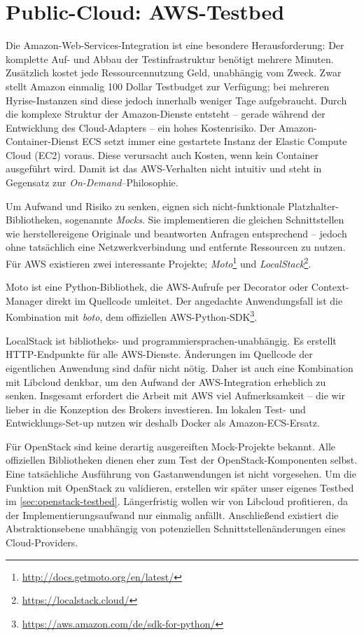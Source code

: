 \section{Public-Cloud: AWS-Testbed}
\label{sec:aws-testbed}

 Die Amazon-Web-Services-Integration ist eine besondere Herausforderung: Der komplette Auf- und Abbau der Testinfrastruktur benötigt mehrere Minuten. Zusätzlich kostet jede Ressourcennutzung Geld, unabhängig vom Zweck. Zwar stellt Amazon einmalig 100 Dollar Testbudget zur Verfügung; bei mehreren Hyrise-Instanzen sind diese jedoch innerhalb weniger Tage aufgebraucht. Durch die komplexe Struktur der Amazon-Dienste entsteht -- gerade während der Entwicklung des Cloud-Adapters -- ein hohes Kostenrisiko. Der Amazon-Container-Dienst ECS setzt immer eine gestartete Instanz der Elastic Compute Cloud (EC2) voraus. Diese verursacht auch Kosten, wenn kein Container ausgeführt wird. Damit ist das AWS-Verhalten nicht intuitiv und steht in Gegensatz zur \emph{On-Demand}--Philosophie.

Um Aufwand und Risiko zu senken, eignen sich nicht-funktionale Platzhalter-Bibliotheken, sogenannte \emph{Mocks}. Sie implementieren die gleichen Schnittstellen wie herstellereigene Originale und beantworten Anfragen entsprechend -- jedoch ohne tatsächlich eine Netzwerkverbindung und entfernte Ressourcen zu nutzen. Für AWS existieren zwei interessante Projekte; \emph{Moto}\footnote{\url{http://docs.getmoto.org/en/latest/}} und \emph{LocalStack}\footnote{\url{https://localstack.cloud/}}. 

Moto ist eine Python-Bibliothek, die AWS-Aufrufe per Decorator oder Context-Manager direkt im Quellcode umleitet. Der angedachte Anwendungsfall ist die Kombination mit \emph{boto}, dem offiziellen AWS-Python-SDK\footnote{\url{https://aws.amazon.com/de/sdk-for-python/}}.

LocalStack ist  bibliotheks- und programmiersprachen-unabhängig. Es erstellt HTTP-Endpunkte für alle AWS-Dienste. Änderungen im Quellcode der eigentlichen Anwendung sind dafür nicht nötig. Daher ist auch eine Kombination mit Libcloud denkbar, um den Aufwand der AWS-Integration erheblich zu senken. Insgesamt erfordert die Arbeit mit AWS viel Aufmerksamkeit -- die wir lieber in die Konzeption des Brokers investieren. Im lokalen Test- und Entwicklungs-Set-up nutzen wir deshalb Docker als Amazon-ECS-Ersatz.

Für OpenStack sind keine derartig ausgereiften Mock-Projekte bekannt. Alle offiziellen Bibliotheken dienen eher zum Test der OpenStack-Komponenten selbst. Eine tatsächliche Ausführung von Gastanwendungen ist nicht vorgesehen. Um die Funktion mit OpenStack zu validieren, erstellen wir später unser eigenes Testbed im \autoref{sec:openstack-testbed}. Längerfristig wollen wir von Libcloud profitieren, da der Implementierungsaufwand nur einmalig anfällt. Anschließend existiert die Abstraktionsebene unabhängig von potenziellen Schnittstellenänderungen eines Cloud-Providers.